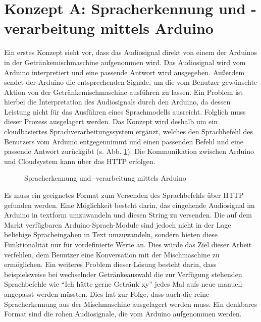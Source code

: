 \section{Konzept A: Spracherkennung und -verarbeitung mittels Arduino}
Ein erstes Konzept sieht vor, dass das Audiosignal direkt von einem der Arduinos in der Getränkemischmaschine aufgenommen wird.
Das Audiosignal wird vom Arduino interpretiert und eine passende Antwort wird ausgegeben.
Außerdem sendet der Arduino die entsprechenden Signale, um die vom Benutzer gewünschte Aktion von der Getränkemischmaschine ausführen zu lassen.
Ein Problem ist hierbei die Interpretation des Audiosignals durch den Arduino, da dessen Leistung nicht für das Ausführen eines Sprachmodells ausreicht.
Folglich muss dieser Prozess ausgelagert werden.
Das Konzept wird deshalb um ein cloudbasiertes Sprachverarbeitungssystem ergänzt, welches den Sprachbefehl des Benutzers vom Arduino entgegennimmt und einen passenden Befehl und eine passende Antwort zurückgibt (s. Abb. \ref{figure:Spracherkennung_mittels_Arduino}).
Die Kommunikation zwischen Arduino und Cloudsystem kann über das \ac{HTTP} erfolgen.
\begin{figure}[H]
    \centering
    \caption{\label{figure:Spracherkennung_mittels_Arduino}Spracherkennung und -verarbeitung mittels Arduino}
\end{figure}
\noindent
Es muss ein geeignetes Format zum Versenden des Sprachbefehls über \ac{HTTP} gefunden werden.
Eine Möglichkeit besteht darin, das eingehende Audiosignal im Arduino in textform umzuwandeln und diesen String zu versenden.
Die auf dem Markt verfügbaren Arduino-Sprach-Module sind jedoch nicht in der Lage beliebige Spracheingaben in Text umzuwandeln, sondern bieten diese Funktionalität nur für vordefinierte Werte an.
Dies würde das Ziel dieser Arbeit verfehlen, dem Benutzer eine Konversation mit der Mischmaschine zu ermöglichen.
Ein weiteres Problem dieser Lösung besteht darin, dass beispielsweise bei wechselnder Getränkeauswahl die zur Verfügung stehenden Sprachbefehle wie "`Ich hätte gerne Getränk xy"' jedes Mal aufs neue manuell angepasst werden müssten.
Dies hat zur Folge, dass auch die reine Spracherkennung aus der Mischmaschine ausgelagert werden muss.
Ein denkbares Format sind die rohen Audiosignale, die vom Arduino aufgenommen werden.
